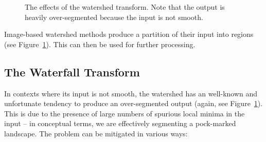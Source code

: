 \documentclass[review,a4paper]{elsarticle}
\newenvironment{stusubfig}[1]
{
	\begin{figure}[#1]
	\begin{center}
}
{
	\end{center}
	\end{figure}
}
\begin{document}
\begin{stusubfig}{p}
	\hspace{4mm}%
\caption{The effects of the watershed transform. Note that the output is heavily over-segmented because the input is not smooth.}
\label{fig:segmentation-watershed-adfexample}
\end{stusubfig}

\noindent Image-based watershed methods produce a partition of their input into regions (see Figure~\ref{fig:segmentation-watershed-adfexample}). This can then be used for further processing.

\subsection{The Waterfall Transform}

In contexts where its input is not smooth, the watershed has an well-known and unfortunate tendency to produce an over-segmented output (again, see Figure~\ref{fig:segmentation-watershed-adfexample}). This is due to the presence of large numbers of spurious local minima in the input -- in conceptual terms, we are effectively segmenting a pock-marked landscape. The problem can be mitigated in various ways:
\end{document}
